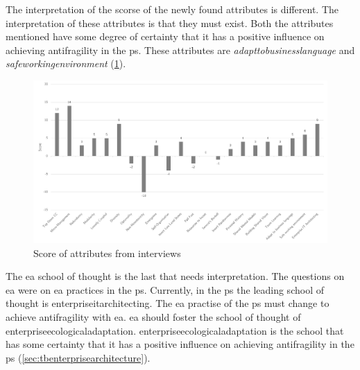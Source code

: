 The interpretation of the scorse of the newly found \glspl{attribute} is different. The interpretation of these \glspl{attribute} is that they must exist. Both the \glspl{attribute} mentioned have some degree of certainty that it has a positive influence on achieving \gls{antifragility} in the \gls{ps}. These attributes are \textit{\gls{adapttobusinesslanguage}} and \textit{\gls{safeworkingenvironment}} (\cref{fig:scoreofattributes}).
\begin{figure}[H]
	\centering
	\includegraphics[width=\textwidth]{images/scoreofattributes}
	\caption[Score of attributes from interviews]{Score of attributes from interviews}
	\label{fig:scoreofattributes}
\end{figure}
The \acrshort{ea} school of thought is the last that needs interpretation. The questions on \acrshort{ea} were on \acrshort{ea} practices in the \gls{ps}. Currently, in the \gls{ps} the leading school of thought is \gls{enterpriseitarchitecting}. The \acrshort{ea} practise of the \gls{ps} must change to achieve \gls{antifragility} with \acrshort{ea}. \acrshort{ea} should foster the school of thought of \gls{enterpriseecologicaladaptation}. \Gls{enterpriseecologicaladaptation} is the school that has some certainty that it has a positive influence on achieving \gls{antifragility} in the \gls{ps}  (\cref{sec:tbenterprisearchitecture}).

